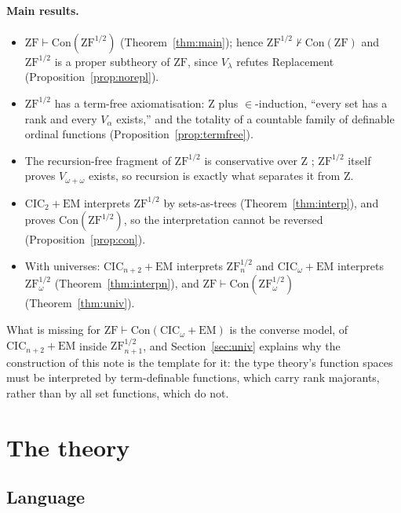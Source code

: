 \documentclass[10pt]{article}
\newcommand{\CIC}{\mathrm{CIC}}
\newcommand{\ZF}{\mathrm{ZF}}
\newcommand{\ZFh}{\mathrm{ZF}^{1/2}}
\newcommand{\Z}{\mathrm{Z}}
\newcommand{\EM}{\mathrm{EM}}
\newcommand{\Con}{\mathrm{Con}}
\begin{document}
\paragraph{Main results.}
\begin{itemize}
\item $\ZF\vdash\Con(\ZFh)$ (Theorem~\ref{thm:main}); hence $\ZFh\nvdash\Con(\ZF)$
  and $\ZFh$ is a proper subtheory of $\ZF$, since $V_\lambda$ refutes
  Replacement (Proposition~\ref{prop:norepl}).
\item $\ZFh$ has a term-free axiomatisation: $\Z$ plus $\in$-induction,
  ``every set has a rank and every $V_\alpha$ exists,'' and the totality
  of a countable family of definable ordinal functions
  (Proposition~\ref{prop:termfree}).
\item The recursion-free fragment of $\ZFh$ is conservative over $\Z$
  \cite{miquel06}; $\ZFh$ itself proves $V_{\omega+\omega}$ exists, so
  recursion is exactly what separates it from $\Z$.
\end{itemize}
\begin{itemize}
\item $\CIC_2+\EM$ interprets $\ZFh$ by sets-as-trees
  (Theorem~\ref{thm:interp}), and proves $\Con(\ZFh)$, so the
  interpretation cannot be reversed (Proposition~\ref{prop:con}).
\item With universes: $\CIC_{n+2}+\EM$ interprets $\ZFh_n$ and
  $\CIC_\omega+\EM$ interprets $\ZFh_\omega$ (Theorem~\ref{thm:interpn}),
  and $\ZF\vdash\Con(\ZFh_\omega)$ (Theorem~\ref{thm:univ}).
\end{itemize}
What is missing for $\ZF\vdash\Con(\CIC_\omega+\EM)$ is the converse
model, of $\CIC_{n+2}+\EM$ inside $\ZFh_{n+1}$, and
Section~\ref{sec:univ} explains why the construction of this note is the
template for it: the type theory's function spaces must be interpreted
by term-definable functions, which carry rank majorants, rather than by
all set functions, which do not.

\section{The theory}\label{sec:theory}

\subsection{Language}
\end{document}
